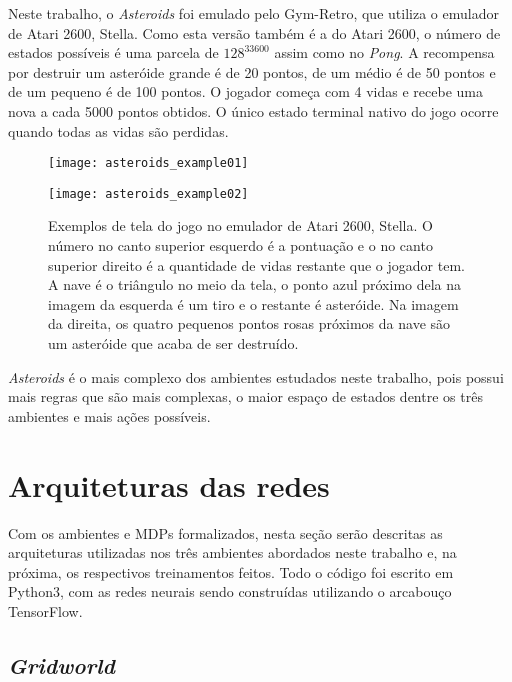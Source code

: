 Neste trabalho, o \textit{Asteroids} foi emulado pelo Gym-Retro, que utiliza o emulador de Atari 2600, Stella.
Como esta versão também é a do Atari 2600, o número de estados possíveis é uma parcela de $128^{33600}$ assim como no \textit{Pong}.
A recompensa por destruir um asteróide grande é de 20 pontos, de um médio é de 50 pontos e de um pequeno é de 100 pontos.
O jogador começa com 4 vidas e recebe uma nova a cada 5000 pontos obtidos.
O único estado terminal nativo do jogo ocorre quando todas as vidas são perdidas.

\begin{figure}[h!]
  \begin{minipage}[b]{.5\textwidth}
  \centering
  \texttt{[image: asteroids\_example01]}
  \end{minipage}
  \hfill
  \begin{minipage}[b]{.5\textwidth}
  \texttt{[image: asteroids\_example02]}
  \end{minipage}
  \caption{Exemplos de tela do jogo no emulador de Atari 2600, Stella. O número no canto superior esquerdo é a pontuação e o no canto superior direito é a quantidade de vidas restante que o jogador tem. A nave é o triângulo no meio da tela, o ponto azul próximo dela na imagem da esquerda é um tiro e o restante é asteróide. Na imagem da direita, os quatro pequenos pontos rosas próximos da nave são um asteróide que acaba de ser destruído.}
\end{figure}

\textit{Asteroids} é o mais complexo dos ambientes estudados neste trabalho, pois possui mais regras que são mais complexas, o maior espaço de estados dentre os três ambientes e mais ações possíveis. 


\section{Arquiteturas das redes}
\label{sec:arq}

Com os ambientes e MDPs formalizados, nesta seção serão descritas as arquiteturas utilizadas nos três ambientes abordados neste trabalho e, na próxima, os respectivos treinamentos feitos.
Todo o código foi escrito em Python3, com as redes neurais sendo construídas utilizando o arcabouço TensorFlow.

\subsection{\textit{Gridworld}}
\label{sec:arq_gw}

